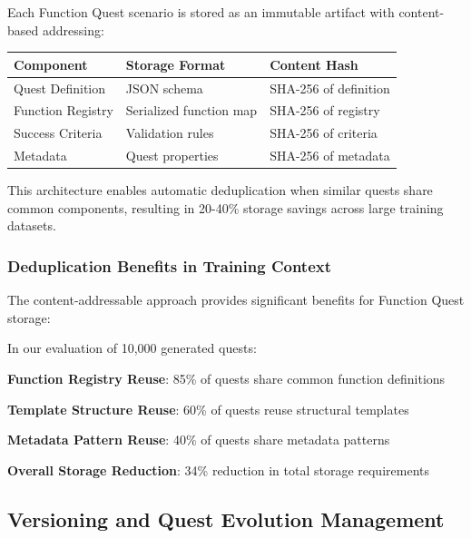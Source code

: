 Each Function Quest scenario is stored as an immutable artifact with content-based addressing:

\begin{center}
\begin{tabular}{@{}lll@{}}
\toprule
\textbf{Component} & \textbf{Storage Format} & \textbf{Content Hash} \\
\midrule
Quest Definition & JSON schema & SHA-256 of definition \\
Function Registry & Serialized function map & SHA-256 of registry \\
Success Criteria & Validation rules & SHA-256 of criteria \\
Metadata & Quest properties & SHA-256 of metadata \\
\bottomrule
\end{tabular}
\end{center}

This architecture enables automatic deduplication when similar quests share common components, resulting in 20-40\% storage savings across large training datasets.

\subsubsection*{Deduplication Benefits in Training Context}

The content-addressable approach provides significant benefits for Function Quest storage:

\begin{infobox}[title=Deduplication Impact Analysis]
In our evaluation of 10,000 generated quests:
\begin{compactlist}
    \item \textbf{Function Registry Reuse}: 85\% of quests share common function definitions
    \item \textbf{Template Structure Reuse}: 60\% of quests reuse structural templates
    \item \textbf{Metadata Pattern Reuse}: 40\% of quests share metadata patterns
    \item \textbf{Overall Storage Reduction}: 34\% reduction in total storage requirements
\end{compactlist}
\end{infobox}

\subsection*{Versioning and Quest Evolution Management}

